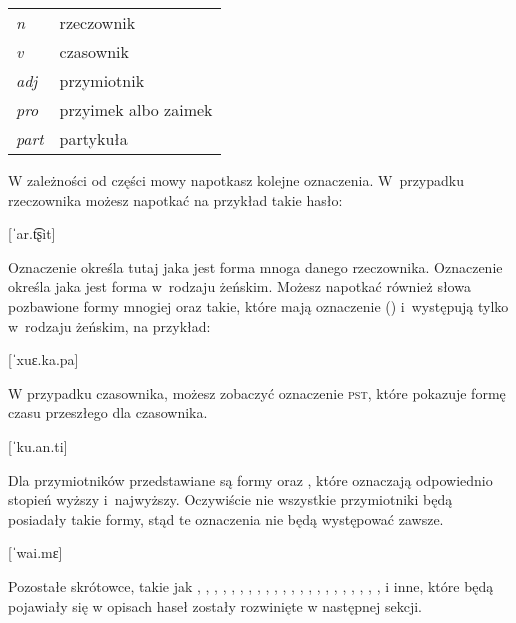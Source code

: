 \begin{spacing}{1.1}
\begin{table}[h]
\begin{tabular}{ll}
\emph{n}    & rzeczownik           \\
\emph{v}    & czasownik            \\
\emph{adj}  & przymiotnik          \\
\emph{pro}  & przyimek albo zaimek \\
\emph{part} & partykuła           
\end{tabular}
\end{table}

W zależności od części mowy napotkasz kolejne oznaczenia. W~przypadku
rzeczownika możesz napotkać na przykład takie hasło:

[ˈar.t͡ʂit]
\skipline

Oznaczenie \Pl{} określa tutaj jaka jest forma mnoga danego rzeczownika.
Oznaczenie \Fem{} określa jaka jest forma w~rodzaju żeńskim. Możesz
napotkać również słowa pozbawione formy mnogiej oraz takie, które mają
oznaczenie (\Fem{}) i~występują tylko w~rodzaju żeńskim, na przykład:

\skipline

[ˈxuɛ.ka.pa]
\skipline

W przypadku czasownika, możesz zobaczyć oznaczenie \textsc{pst}, które pokazuje
formę czasu przeszłego dla czasownika.

[ˈku.an.ti]
\skipline

Dla przymiotników przedstawiane są formy \Comp{} oraz \Supl{}, które
oznaczają odpowiednio stopień wyższy i~najwyższy. Oczywiście nie wszystkie
przymiotniki będą posiadały takie formy, stąd te oznaczenia nie będą występować
zawsze.

[ˈwai.mɛ]
\skipline

Pozostałe skrótowce, takie jak \Dem{}, \Nan{}, \Rel{}, \Refl{}, \Tsg{}, \Ssg{},
\Tpl{}, \Fpl{}, \Fsg{}, \Poss{}, \Ins{}, \Emph{}, \Imp{}, \Acc{}, \Gen{},
\Dat{}, \Abl{}, \Loc{}, \Voc{}, \Nfrm{}, \Imp{}, \Cond{}, \Top{} i inne, które
będą pojawiały się w opisach haseł zostały rozwinięte w następnej sekcji.

\printglosses[style=list]

\end{spacing}